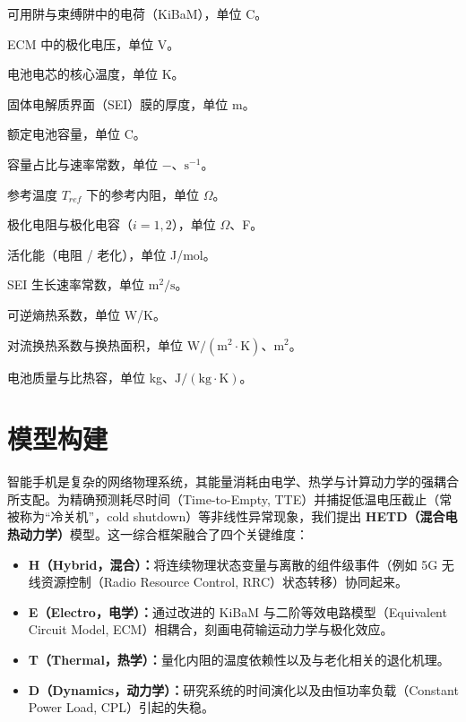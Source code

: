 \documentclass[11pt,a4paper]{ctexart}
\begin{document}
\begin{description}[leftmargin=5.6em, itemsep=0.02em, parsep=0em, topsep=0.15em]
\small
\item[\textit{状态变量}]
\item[$y_1,\,y_2$] 可用阱与束缚阱中的电荷（KiBaM），单位 C。
\item[$V_1,\,V_2$] ECM 中的极化电压，单位 V。
\item[$T$] 电池电芯的核心温度，单位 K。
\item[$L_{SEI}$] 固体电解质界面（SEI）膜的厚度，单位 m。
\item[\textit{模型参数}]
\item[$C_{nom}$] 额定电池容量，单位 C。
\item[$c,\,k$] 容量占比与速率常数，单位 $-$、$\mathrm{s}^{-1}$。
\item[$R_{ref}$] 参考温度 $T_{ref}$ 下的参考内阻，单位 $\Omega$。
\item[$R_i,\,C_i$] 极化电阻与极化电容（$i = 1, 2$），单位 $\Omega$、F。
\item[$E_a,\,E_{sei}$] 活化能（电阻 / 老化），单位 J/mol。
\item[$k_{sei}$] SEI 生长速率常数，单位 $\mathrm{m}^2/\mathrm{s}$。
\item[$\dot{Q}_{ent}$] 可逆熵热系数，单位 W/K。
\item[$h,\,A$] 对流换热系数与换热面积，单位 $\mathrm{W}/(\mathrm{m}^2\cdot\mathrm{K})$、$\mathrm{m}^2$。
\item[$m,\,C_p$] 电池质量与比热容，单位 kg、$\mathrm{J}/(\mathrm{kg}\cdot\mathrm{K})$。
\end{description}


\section{模型构建}

智能手机是复杂的网络物理系统，其能量消耗由电学、热学与计算动力学的强耦合所支配。为精确预测耗尽时间（Time-to-Empty, TTE）并捕捉低温电压截止（常被称为“冷关机”，cold shutdown）等非线性异常现象，我们提出 \textbf{HETD（混合电热动力学）}模型。这一综合框架融合了四个关键维度：

\begin{itemize}[leftmargin=1.6em,itemsep=0.4em]
\item \textbf{H（Hybrid，混合）：}将连续物理状态变量与离散的组件级事件（例如 5G 无线资源控制（Radio Resource Control, RRC）状态转移）协同起来。

\item \textbf{E（Electro，电学）：}通过改进的 KiBaM 与二阶等效电路模型（Equivalent Circuit Model, ECM）相耦合，刻画电荷输运动力学与极化效应。

\item \textbf{T（Thermal，热学）：}量化内阻的温度依赖性以及与老化相关的退化机理。

\item \textbf{D（Dynamics，动力学）：}研究系统的时间演化以及由恒功率负载（Constant Power Load, CPL）引起的失稳。

\end{itemize}
\end{document}
